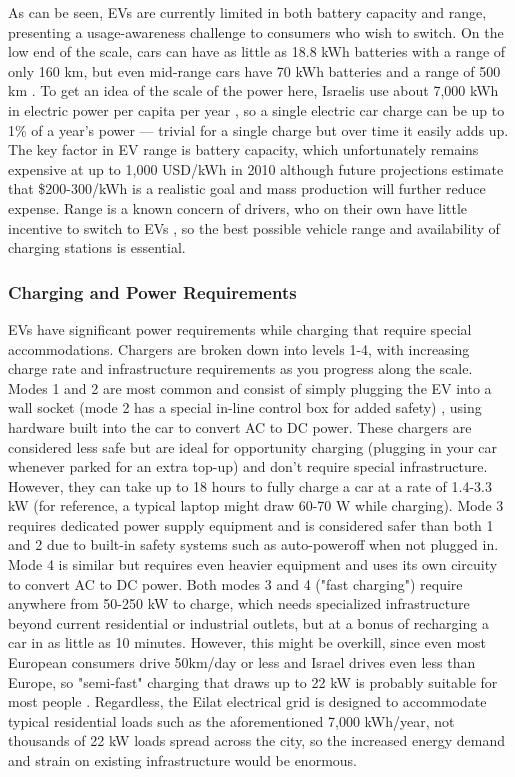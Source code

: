 \documentclass[12pt]{article}                         %
\begin{document}
As can be seen, EVs are currently limited in both battery capacity and range, presenting a usage-awareness challenge to consumers who wish to switch. On the low end of the scale, cars can have as little as 18.8 kWh batteries with a range of only 160 km, but even mid-range cars have 70 kWh batteries and a range of 500 km \cite{Glon2018HeresPerformance}. To get an idea of the scale of the power here, Israelis use about 7,000 kWh in electric power per capita per year \cite{2018Key2018}, so a single electric car charge can be up to 1\% of a year's power --- trivial for a single charge but over time it easily adds up. The key factor in EV range is battery capacity, which unfortunately remains expensive at up to 1,000 USD/kWh in 2010 \cite{Mock2010MarketVehicles} although future projections estimate that \$200-300/kWh is a realistic goal and mass production will further reduce expense. Range is a known concern of drivers, who on their own have little incentive to switch to EVs \cite{Mock2010MarketVehicles}, so the best possible vehicle range and availability of charging stations is essential.

\subsubsection{Charging and Power Requirements}
EVs have significant power requirements while charging that require special accommodations. Chargers are broken down into levels 1-4, with increasing charge rate and infrastructure requirements as you progress along the scale. Modes 1 and 2 are most common and consist of simply plugging the EV into a wall socket (mode 2 has a special in-line control box for added safety) \cite{Bossche2010ElectricInfrastructure}, using hardware built into the car to convert AC to DC power. These chargers are considered less safe but are ideal for opportunity charging (plugging in your car whenever parked for an extra top-up) and don't require special infrastructure. However, they can take up to 18 hours to fully charge a car at a rate of 1.4-3.3 kW \cite{Ustun2015ImpactSystems} (for reference, a typical laptop might draw 60-70 W while charging). Mode 3 requires dedicated power supply equipment and is considered safer than both 1 and 2 due to built-in safety systems such as auto-poweroff when not plugged in. Mode 4 is similar but requires even heavier equipment and uses its own circuity to convert AC to DC power. Both modes 3 and 4 ("fast charging") require anywhere from 50-250 kW \cite{Ustun2015ImpactSystems, Bossche2010ElectricInfrastructure} to charge, which needs specialized infrastructure beyond current residential or industrial outlets, but at a bonus of recharging a car in as little as 10 minutes. However, this might be overkill, since even most European consumers drive 50km/day or less and Israel drives even less than Europe, so "semi-fast" charging that draws up to 22 kW is probably suitable for most people \cite{Bossche2010ElectricInfrastructure}. Regardless, the Eilat electrical grid is designed to accommodate typical residential loads such as the aforementioned 7,000 kWh/year, not thousands of 22 kW loads spread across the city, so the increased energy demand and strain on existing infrastructure would be enormous.
\end{document}

